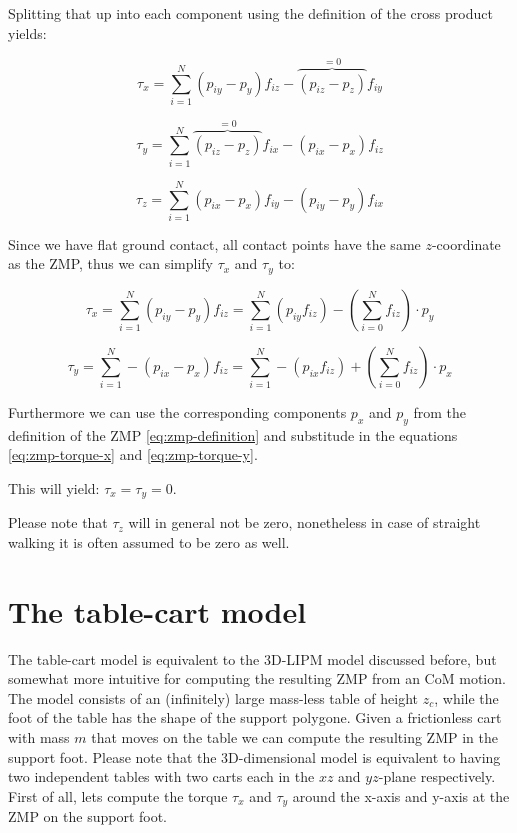 \documentclass[english,ngerman]{KITreprt}
\begin{document}
Splitting that up into each component using the definition of the cross
product yields:

\begin{equation}
\tau_x = \sum^N_{i=1} (p_{iy} - p_y) f_{iz} - \overbrace{(p_{iz} - p_z)}^{=0} f_{iy}
\end{equation}

\begin{equation}
\tau_y = \sum^N_{i=1} \overbrace{(p_{iz} - p_z)}^{=0} f_{ix} - (p_{ix} - p_x) f_{iz}
\end{equation}

\begin{equation}
\tau_z = \sum^N_{i=1} (p_{ix} - p_x) f_{iy} - (p_{iy} - p_y) f_{ix}
\end{equation}

Since we have flat ground contact, all contact points have the same
$z$-coordinate as the ZMP, thus we can simplify $\tau_x$ and $\tau_y$
to:

\begin{equation} \label{eq:zmp-torque-x}
\tau_x = \sum^N_{i=1} (p_{iy} - p_y) f_{iz} = \sum^N_{i=1} (p_{iy} f_{iz}) - (\sum^N_{i=0} f_{iz}) \cdot p_y
\end{equation}

\begin{equation}\label{eq:zmp-torque-y}
\tau_y = \sum^N_{i=1} - (p_{ix} - p_x) f_{iz} = \sum^N_{i=1} - (p_{ix} f_{iz}) + (\sum^N_{i=0} f_{iz}) \cdot p_x
\end{equation}

Furthermore we can use the corresponding components $p_x$ and $p_y$ from
the definition of the ZMP \ref{eq:zmp-definition} and substitude in the
equations \ref{eq:zmp-torque-x} and \ref{eq:zmp-torque-y}.

This will yield: $\tau_x = \tau_y = 0$.

Please note that $\tau_z$ will in general not be zero, nonetheless in
case of straight walking it is often assumed to be zero as well.

\section{The table-cart model}\label{section:table-cart}

The table-cart model is equivalent to the 3D-LIPM model discussed
before, but somewhat more intuitive for computing the resulting ZMP from
an CoM motion. The model consists of an (infinitely) large mass-less
table of height $z_c$, while the foot of the table has the shape of the
support polygone. Given a frictionless cart with mass $m$ that moves on
the table we can compute the resulting ZMP in the support foot. Please
note that the 3D-dimensional model is equivalent to having two
independent tables with two carts each in the $xz$ and $yz$-plane
respectively. First of all, lets compute the torque $\tau_x$ and
$\tau_y$ around the x-axis and y-axis at the ZMP on the support foot.
\end{document}
